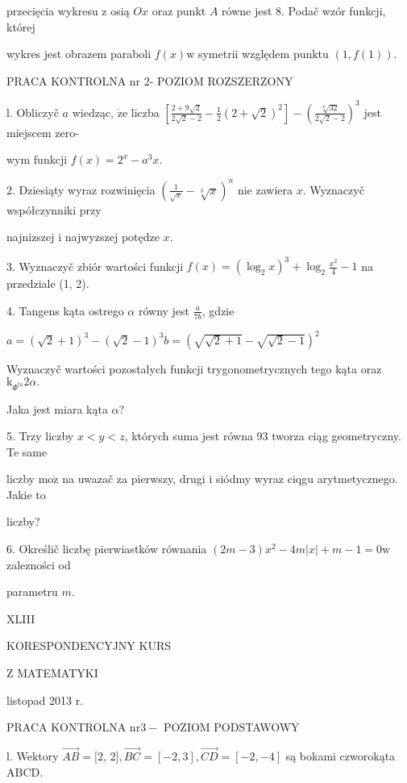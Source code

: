 \documentclass[a4paper,12pt]{article}
\begin{document}
przecięcia wykresu $\mathrm{z}$ osią $Ox$ oraz punkt $A$ równe jest 8. Podač wzór funkcji, której

wykres jest obrazem paraboli $f(x)\mathrm{w}$ symetrii względem punktu $(1,f(1)).$





PRACA KONTROLNA nr 2- POZIOM ROZSZERZONY

l. Obliczyč $a$ wiedząc, $\dot{\mathrm{z}}\mathrm{e}$ liczba $[\displaystyle \frac{2+9\sqrt{2}}{2\sqrt{2}-2}-\frac{1}{2}(2+\sqrt{2})^{2}]-(\frac{\sqrt[6]{32}}{2\sqrt{2}-2})^{3}$ jest miejscem zero-

wym funkcji $f(x)=2^{x}-a^{3}x.$

2. Dziesiąty wyraz rozwinięcia $(\displaystyle \frac{1}{\sqrt{x}}-\sqrt[3]{x})^{n}$ nie zawiera $x$. Wyznaczyč współczynniki przy

najnizszej $\mathrm{i}$ najwyzszej potędze $x.$

3. Wyznaczyč zbiór wartości funkcji $f(x)=(\displaystyle \log_{2}x)^{3}+\log_{2}\frac{x^{2}}{4}-1$ na przedziale (1, 2).

4. Tangens kąta ostrego $\alpha$ równy jest $\displaystyle \frac{a}{7b}$, gdzie

$a=(\sqrt{2}+1)^{3}-(\sqrt{2}-1)^{3}b=(\sqrt{\sqrt{2}+1}-\sqrt{\sqrt{2}-1})^{2}$

Wyznaczyč wartości pozostalych funkcji trygonometrycznych tego kąta oraz $\mathrm{k}_{\Phi^{\mathrm{t}\mathrm{a}}}2\alpha.$

Jaka jest miara kąta $\alpha$?

5. Trzy liczby $x<y<z$, których suma jest równa 93 tworza ciąg geometryczny. Te same

liczby $\mathrm{m}\mathrm{o}\dot{\mathrm{z}}$ na uwazač za pierwszy, drugi $\mathrm{i}$ siódmy wyraz ciqgu arytmetycznego. Jakie to

liczby?

6. Określič liczbę pierwiastków równania $(2m-3)x^{2}-4m|x|+m-1=0\mathrm{w}$ zalezności od

parametru $m.$





XLIII

KORESPONDENCYJNY KURS

Z MATEMATYKI

listopad 2013 r.

PRACA KONTROLNA $\mathrm{n}\mathrm{r} 3-$ POZIOM PODSTAWOWY

l. Wektory $\vec{AB} = [2$, 2$], \vec{BC} = [-2,3], \vec{CD} = [-2,-4]$ są bokami czworokąta ABCD.
\end{document}
